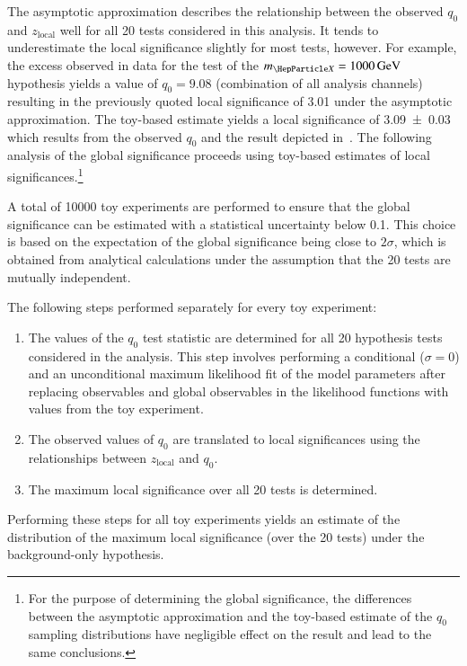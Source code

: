 The asymptotic approximation describes the relationship between the observed
$q_0$ and $z_{\text{local}}$ well for all 20 tests considered in this
analysis. It tends to underestimate the local significance slightly for most
tests, however. For example, the excess observed in data for the test of the
$\mX = \SI{1000}{\GeV}$ hypothesis yields a value of $q_0 = \num{9.08}$
(combination of all analysis channels) resulting in the previously quoted local
significance of \num{3.01} under the asymptotic approximation. The toy-based
estimate yields a local significance of \num{3.09 +- 0.03} which results from
the observed $q_0$ and the result depicted
in~. The following analysis of the global
significance proceeds using toy-based estimates of local
significances.\footnote{For the purpose of determining the global significance,
  the differences between the asymptotic approximation and the toy-based
  estimate of the $q_0$ sampling distributions have negligible effect on the
  result and lead to the same conclusions.}

A total of \num{10000} toy experiments are performed to ensure that the global
significance can be estimated with a statistical uncertainty below
\num{0.1}. This choice is based on the expectation of the global significance
being close to $2\sigma$, which is obtained from analytical calculations under
the assumption that the 20 tests are mutually independent.

The following steps performed separately for every toy experiment:
\begin{enumerate}

\item The values of the $q_0$ test statistic are determined for all 20
  hypothesis tests considered in the analysis. This step involves performing a
  conditional ($\sigma = 0$) and an unconditional maximum likelihood fit of the
  model parameters after replacing observables and global observables in the
  likelihood functions with values from the toy experiment.

\item The observed values of $q_0$ are translated to local significances using
  the relationships between $z_{\text{local}}$ and $q_0$.

\item The maximum local significance over all 20 tests is determined.

\end{enumerate}
Performing these steps for all toy experiments yields an estimate of the
distribution of the maximum local significance (over the 20 tests) under the
background-only hypothesis.

